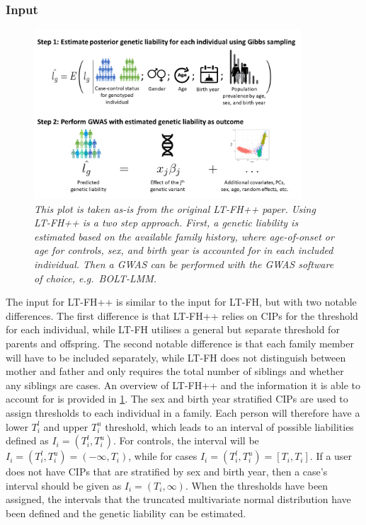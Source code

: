 \subsubsection{Input}
\begin{figure}
	\includegraphics[width=10cm]{methods/ltfhpp_steps.png}
	\caption[Overview of LT-FH++ and what information it can account for in GWAS]{
		\sl This plot is taken as-is from the original LT-FH++ paper\cite{pedersen2022accounting}. Using LT-FH++ is a two step approach. First, a genetic liability is estimated based on the available family history, where age-of-onset or age for controls, sex, and birth year is accounted for in each included individual. Then a GWAS can be performed with the GWAS software of choice, e.g.\ BOLT-LMM.
	} %
	\label{fig:LTFHppFigure1}
\end{figure}

The input for LT-FH++ is similar to the input for LT-FH, but with two notable differences. The first difference is that LT-FH++ relies on CIPs for the threshold for each individual, while LT-FH utilises a general but separate threshold for parents and offspring. The second notable difference is that each family member will have to be included separately, while LT-FH does not distinguish between mother and father and only requires the total number of siblings and whether any siblings are cases. An overview of LT-FH++ and the information it is able to account for is provided in \cref{fig:LTFHppFigure1}. The sex and birth year stratified CIPs are used to assign thresholds to each individual in a family. Each person will therefore have a lower $ T_i^l $ and upper $ T_i^u $ threshold, which leads to an interval of possible liabilities defined as $ I_i = (T_i^l, T_i^u) $. For controls, the interval will be $ I_i = (T_i^l,T_i^u) = (-\infty, T_i) $, while for cases $ I_i = (T_i^l,T_i^u) = [T_i,T_i] $. If a user does not have CIPs that are stratified by sex and birth year, then a case's interval should be given as $ I_i = (T_i, \infty) $. When the thresholds have been assigned, the intervals that the truncated multivariate normal distribution have been defined and the genetic liability can be estimated. 


